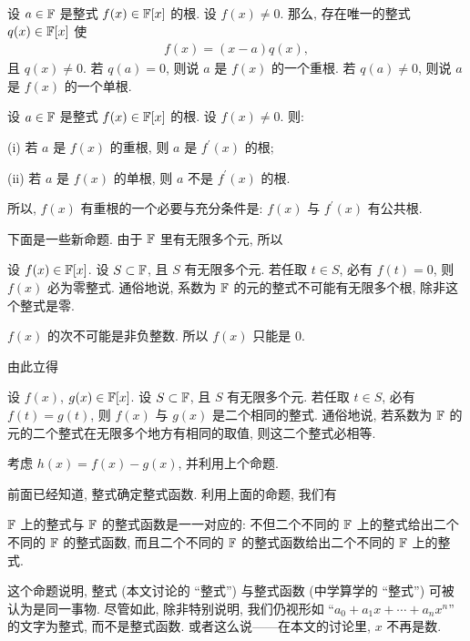 \begin{definition}
    设 $a \in \mathbb{F}$ 是整式 $f(x) \in \mathbb{F}[x]$ 的根. 设 $f(x) \neq 0$. 那么, 存在唯一的整式 $q(x) \in \mathbb{F}[x]$ 使
    \begin{align*}
        f(x) = (x - a) q(x),
    \end{align*}
    且 $q(x) \neq 0$. 若 $q(a) = 0$, 则说 $a$ 是 $f(x)$ 的一个重根. 若 $q(a) \neq 0$, 则说 $a$ 是 $f(x)$ 的一个单根.
\end{definition}

\begin{proposition}
    设 $a \in \mathbb{F}$ 是整式 $f(x) \in \mathbb{F}[x]$ 的根. 设 $f(x) \neq 0$. 则:

    (i) 若 $a$ 是 $f(x)$ 的重根, 则 $a$ 是 $f^{\prime} (x)$ 的根;

    (ii) 若 $a$ 是 $f(x)$ 的单根, 则 $a$ 不是 $f^{\prime} (x)$ 的根.

    所以, $f(x)$ 有重根的一个必要与充分条件是: $f(x)$ 与 $f^{\prime} (x)$ 有公共根.
\end{proposition}

下面是一些新命题. 由于 $\mathbb{F}$ 里有无限多个元, 所以

\begin{proposition}
    设 $f(x) \in \mathbb{F}[x]$. 设 $S \subset \mathbb{F}$, 且 $S$ 有无限多个元. 若任取 $t \in S$, 必有 $f(t) = 0$, 则 $f(x)$ 必为零整式. 通俗地说, 系数为 $\mathbb{F}$ 的元的整式不可能有无限多个根, 除非这个整式是零.
\end{proposition}

\begin{pf}
    $f(x)$ 的次不可能是非负整数. 所以 $f(x)$ 只能是 $0$.
\end{pf}

由此立得

\begin{proposition}
    设 $f(x)$, $g(x) \in \mathbb{F}[x]$. 设 $S \subset \mathbb{F}$, 且 $S$ 有无限多个元. 若任取 $t \in S$, 必有 $f(t) = g(t)$, 则 $f(x)$ 与 $g(x)$ 是二个相同的整式. 通俗地说, 若系数为 $\mathbb{F}$ 的元的二个整式在无限多个地方有相同的取值, 则这二个整式必相等.
\end{proposition}

\begin{pf}
    考虑 $h(x) = f(x) - g(x)$, 并利用上个命题.
\end{pf}

前面已经知道, 整式确定整式函数. 利用上面的命题, 我们有

\begin{proposition}
    $\mathbb{F}$ 上的整式与 $\mathbb{F}$ 的整式函数是一一对应的: 不但二个不同的 $\mathbb{F}$ 上的整式给出二个不同的 $\mathbb{F}$ 的整式函数, 而且二个不同的 $\mathbb{F}$ 的整式函数给出二个不同的 $\mathbb{F}$ 上的整式.
\end{proposition}

\begin{remark}
    这个命题说明, 整式 (本文讨论的 ``整式'') 与整式函数 (中学算学的 ``整式'') 可被认为是同一事物. 尽管如此, 除非特别说明, 我们仍视形如 ``$a_0 + a_1 x + \cdots + a_n x^n$'' 的文字为整式, 而不是整式函数. 或者这么说——在本文的讨论里, $x$ 不再是数.
\end{remark}
